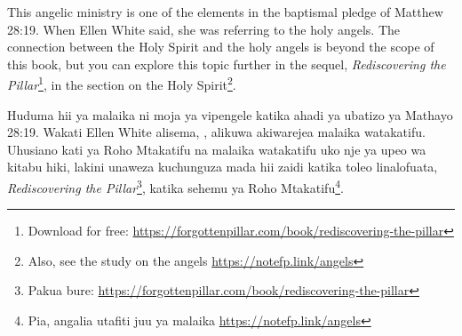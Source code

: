 This angelic ministry is one of the elements in the baptismal pledge of Matthew 28:19. When Ellen White said,  she was referring to the holy angels. The connection between the Holy Spirit and the holy angels is beyond the scope of this book, but you can explore this topic further in the sequel, \textit{Rediscovering the Pillar}\footnote{Download for free: \href{https://forgottenpillar.com/book/rediscovering-the-pillar}{https://forgottenpillar.com/book/rediscovering-the-pillar}}, in the section on the Holy Spirit\footnote{Also, see the study on the angels \href{https://notefp.link/angels}{https://notefp.link/angels}}.


Huduma hii ya malaika ni moja ya vipengele katika ahadi ya ubatizo ya Mathayo 28:19. Wakati Ellen White alisema, , alikuwa akiwarejea malaika watakatifu. Uhusiano kati ya Roho Mtakatifu na malaika watakatifu uko nje ya upeo wa kitabu hiki, lakini unaweza kuchunguza mada hii zaidi katika toleo linalofuata, \textit{Rediscovering the Pillar}\footnote{Pakua bure: \href{https://forgottenpillar.com/book/rediscovering-the-pillar}{https://forgottenpillar.com/book/rediscovering-the-pillar}}, katika sehemu ya Roho Mtakatifu\footnote{Pia, angalia utafiti juu ya malaika \href{https://notefp.link/angels}{https://notefp.link/angels}}.






